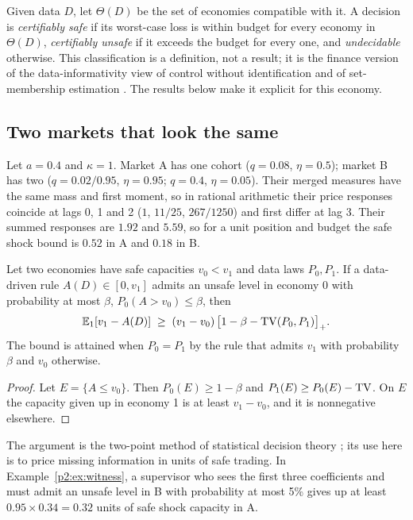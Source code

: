 Given data $D$, let $\Theta(D)$ be the set of economies compatible with it. A decision is \emph{certifiably safe} if its worst-case loss is within budget for every economy in $\Theta(D)$, \emph{certifiably unsafe} if it exceeds the budget for every one, and \emph{undecidable} otherwise. This classification is a definition, not a result; it is the finance version of the data-informativity view of control without identification \citep{p2:vanwaarde2020} and of set-membership estimation \citep{p2:milanese1991}. The results below make it explicit for this economy.

    \subsection{Two markets that look the same}
\begin{example}\label{p2:ex:witness}
Let $a=0.4$ and $\kappa=1$. Market A has one cohort ($q=0.08$, $\eta=0.5$); market B has two ($q=0.02/0.95$, $\eta=0.95$; $q=0.4$, $\eta=0.05$). Their merged measures have the same mass and first moment, so in rational arithmetic their price responses coincide at lags 0, 1 and 2 ($1$, $11/25$, $267/1250$) and first differ at lag 3. Their summed responses are $1.92$ and $5.59$, so for a unit position and budget the safe shock bound is $0.52$ in A and $0.18$ in B.
\end{example}

\begin{proposition}\label{p2:prop:twoworld}
Let two economies have safe capacities $v_0<v_1$ and data laws $P_0,P_1$. If a data-driven rule $A(D)\in[0,v_1]$ admits an unsafe level in economy 0 with probability at most $\beta$, $P_0(A>v_0)\le\beta$, then
\[
\mathbb{E}_1[v_1-A(D)]\;\ge\;(v_1-v_0)\,\bigl[1-\beta-{\rm TV}(P_0,P_1)\bigr]_+ .
\]
The bound is attained when $P_0=P_1$ by the rule that admits $v_1$ with probability $\beta$ and $v_0$ otherwise.
\end{proposition}

\begin{proof}
Let $E=\{A\le v_0\}$. Then $P_0(E)\ge1-\beta$ and $P_1(E)\ge P_0(E)-{\rm TV}$. On $E$ the capacity given up in economy 1 is at least $v_1-v_0$, and it is nonnegative elsewhere.
\end{proof}

The argument is the two-point method of statistical decision theory \citep{p2:lecam1986}; its use here is to price missing information in units of safe trading. In Example~\ref{p2:ex:witness}, a supervisor who sees the first three coefficients and must admit an unsafe level in B with probability at most 5\% gives up at least $0.95\times0.34=0.32$ units of safe shock capacity in A.

